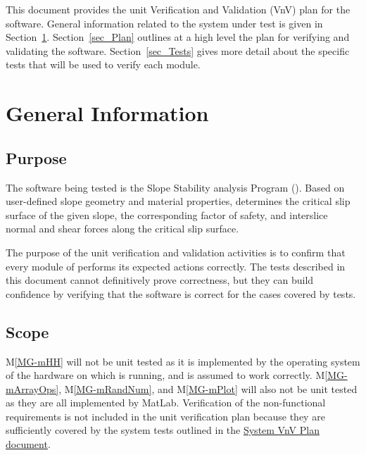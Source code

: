 \documentclass[12pt, titlepage]{article}
\newcommand{\mref}[1]{M\ref{#1}}
\begin{document}
\newpage


This document provides the unit Verification and Validation (VnV) plan for the 
software. General information related to the system under test is given in 
Section~\ref{sec_Info}. Section~\ref{sec_Plan} outlines at a high level the 
plan for verifying and validating the software. Section~\ref{sec_Tests} gives 
more detail about the specific tests that will be used to verify each module.

\section{General Information} \label{sec_Info}

\subsection{Purpose}

\noindent The software being tested is the Slope Stability analysis Program 
(\progname{}). Based on user-defined slope geometry and material properties, 
\progname{} determines the critical slip surface of the given slope, the 
corresponding factor of safety, and interslice normal and shear forces along 
the critical slip surface.

\noindent The purpose of the unit verification and validation activities is to 
confirm that every module of \progname{} performs its expected actions 
correctly. The tests described in this document cannot definitively prove 
correctness, but they can build confidence by verifying that the software is 
correct for the cases covered by tests.

\subsection{Scope}

\noindent \mref{MG-mHH} will not be unit tested as it is implemented by the 
operating system of the hardware on which \progname{} is running, and is 
assumed to work correctly. \mref{MG-mArrayOps}, \mref{MG-mRandNum}, and 
\mref{MG-mPlot} 
will also not be unit tested as they are all implemented by MatLab. 
Verification of the non-functional requirements is not included in the unit 
verification plan because they are sufficiently covered by the system tests 
outlined in the 
\href{https://github.com/smiths/caseStudies/blob/master/CaseStudies/ssp/docs/VnVPlan/SystVnVPlan/SystVnVPlan.pdf}
{System VnV Plan document}.
\end{document}
